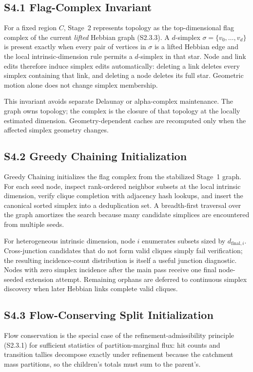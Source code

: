\documentclass[11pt]{article}
\begin{document}
\subsection*{S4.1 Flag-Complex Invariant}
For a fixed region $C$, Stage~2 represents topology as the top-dimensional flag complex of the current \emph{lifted} Hebbian graph (S2.3.3). A $d$-simplex $\sigma=\{v_0,\dots,v_d\}$ is present exactly when every pair of vertices in $\sigma$ is a lifted Hebbian edge and the local intrinsic-dimension rule permits a $d$-simplex in that star. Node and link edits therefore induce simplex edits automatically: deleting a link deletes every simplex containing that link, and deleting a node deletes its full star. Geometric motion alone does not change simplex membership.

This invariant avoids separate Delaunay or alpha-complex maintenance. The graph owns topology; the complex is the closure of that topology at the locally estimated dimension. Geometry-dependent caches are recomputed only when the affected simplex geometry changes.

\subsection*{S4.2 Greedy Chaining Initialization}
Greedy Chaining initializes the flag complex from the stabilized Stage~1 graph. For each seed node, inspect rank-ordered neighbor subsets at the local intrinsic dimension, verify clique completion with adjacency hash lookups, and insert the canonical sorted simplex into a deduplication set. A breadth-first traversal over the graph amortizes the search because many candidate simplices are encountered from multiple seeds.

For heterogeneous intrinsic dimension, node $i$ enumerates subsets sized by $d_{\mathrm{final},i}$. Cross-junction candidates that do not form valid cliques simply fail verification; the resulting incidence-count distribution is itself a useful junction diagnostic. Nodes with zero simplex incidence after the main pass receive one final node-seeded extension attempt. Remaining orphans are deferred to continuous simplex discovery when later Hebbian links complete valid cliques.

\subsection*{S4.3 Flow-Conserving Split Initialization}
Flow conservation is the special case of the refinement-admissibility principle (S2.3.1) for sufficient statistics of partition-marginal flux: hit counts and transition tallies decompose exactly under refinement because the catchment mass partitions, so the children's totals must sum to the parent's.
\end{document}
